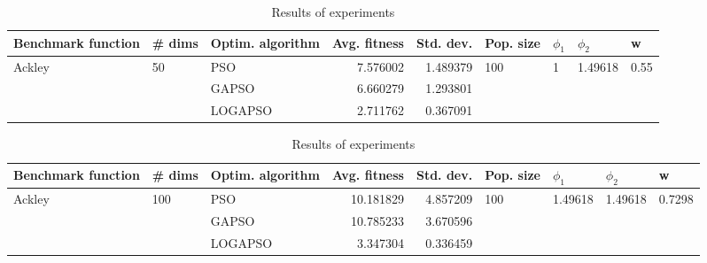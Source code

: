 \documentclass{article}
\begin{document}
\begin{table}
\centering
\caption{Results of experiments}
\begin{tabular}{lllrrllll}
\toprule
     Benchmark function &             \# dims & Optim. algorithm &  Avg. fitness &  Std. dev. &            Pop. size &         $\phi_{1}$ &               $\phi_{2}$ &                     w \\
\midrule
\multirow{3}{*}{Ackley} & \multirow{3}{*}{50} &              PSO &      7.576002 &   1.489379 & \multirow{3}{*}{100} & \multirow{3}{*}{1} & \multirow{3}{*}{1.49618} & \multirow{3}{*}{0.55} \\
                        &                     &            GAPSO &      6.660279 &   1.293801 &                      &                    &                          &                       \\
                        &                     &          LOGAPSO &      2.711762 &   0.367091 &                      &                    &                          &                       \\
\bottomrule
\end{tabular}
\end{table}
\begin{table}
\centering
\caption{Results of experiments}
\begin{tabular}{lllrrllll}
\toprule
     Benchmark function &              \# dims & Optim. algorithm &  Avg. fitness &  Std. dev. &            Pop. size &               $\phi_{1}$ &               $\phi_{2}$ &                       w \\
\midrule
\multirow{3}{*}{Ackley} & \multirow{3}{*}{100} &              PSO &     10.181829 &   4.857209 & \multirow{3}{*}{100} & \multirow{3}{*}{1.49618} & \multirow{3}{*}{1.49618} & \multirow{3}{*}{0.7298} \\
                        &                      &            GAPSO &     10.785233 &   3.670596 &                      &                          &                          &                         \\
                        &                      &          LOGAPSO &      3.347304 &   0.336459 &                      &                          &                          &                         \\
\bottomrule
\end{tabular}
\end{table}
\end{document}
